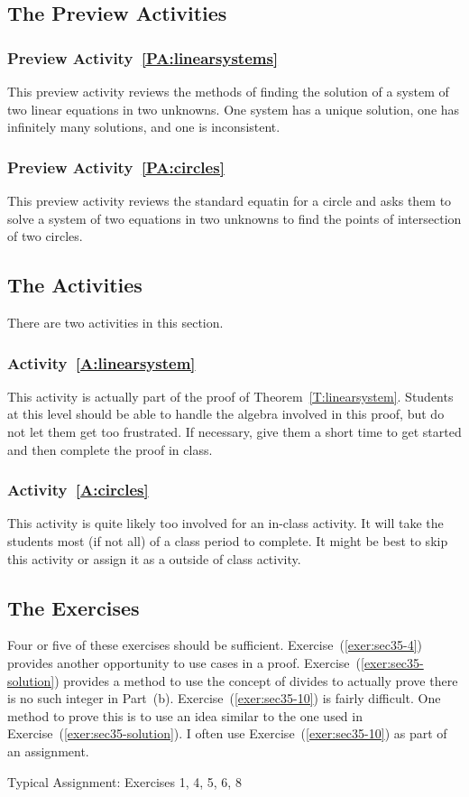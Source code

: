 \subsection*{The Preview Activities}
\subsubsection*{Preview Activity~\ref{PA:linearsystems}} 
This preview activity reviews the methods of finding the solution of a system of two linear equations in two unknowns.  One system has a unique solution, one has infinitely many solutions, and one is inconsistent.

\subsubsection*{Preview Activity~\ref{PA:circles}}  
This preview activity reviews the standard equatin for a circle and asks them to solve a system of two equations in two unknowns to find the points of intersection of two circles.
\hbreak

\subsection*{The Activities}
There are two activities in this section.

\subsubsection*{Activity~\ref{A:linearsystem}}
This activity is actually part of the proof of Theorem~\ref{T:linearsystem}.  Students at this level should be able to handle the algebra involved in this proof, but do not let them get too frustrated.  If necessary, give them a short time to get started and then complete the proof in class.

\subsubsection*{Activity~\ref{A:circles}}
This activity is quite likely too involved for an in-class activity.  It will take the students most (if not all) of a class period to complete.  It might be best to skip this activity or assign it as a outside of class activity.
\hbreak

\subsection*{The Exercises}
Four or five of these exercises should be sufficient.  Exercise~(\ref{exer:sec35-4}) provides another opportunity to use cases in a proof.  Exercise~(\ref{exer:sec35-solution}) provides a method to use the concept of divides to actually prove there is no such integer in Part~(b).  Exercise~(\ref{exer:sec35-10}) is fairly difficult.  One method to prove this is to use an idea similar to the one used in Exercise~(\ref{exer:sec35-solution}).  I often use Exercise~(\ref{exer:sec35-10}) as part of an assignment.

\vskip6pt
\noindent
Typical Assignment:  Exercises 1, 4, 5, 6, 8

\hbreak
